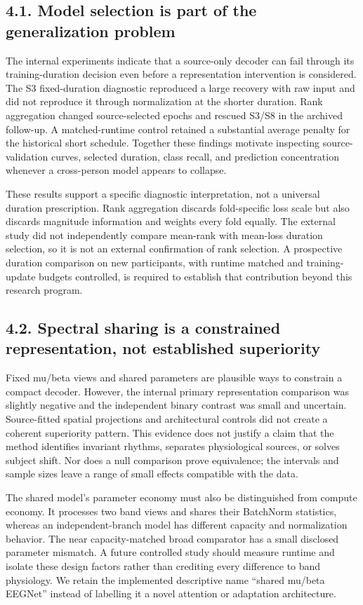 \documentclass[11pt]{article}
\begin{document}
\subsection*{4.1. Model selection is part of the generalization problem}
The internal experiments indicate that a source-only decoder can fail through its training-duration decision even before a representation intervention is considered. The S3 fixed-duration diagnostic reproduced a large recovery with raw input and did not reproduce it through normalization at the shorter duration. Rank aggregation changed source-selected epochs and rescued S3/S8 in the archived follow-up. A matched-runtime control retained a substantial average penalty for the historical short schedule. Together these findings motivate inspecting source-validation curves, selected duration, class recall, and prediction concentration whenever a cross-person model appears to collapse.

These results support a specific diagnostic interpretation, not a universal duration prescription. Rank aggregation discards fold-specific loss scale but also discards magnitude information and weights every fold equally. The external study did not independently compare mean-rank with mean-loss duration selection, so it is not an external confirmation of rank selection. A prospective duration comparison on new participants, with runtime matched and training-update budgets controlled, is required to establish that contribution beyond this research program.

\subsection*{4.2. Spectral sharing is a constrained representation, not established superiority}
Fixed mu/beta views and shared parameters are plausible ways to constrain a compact decoder. However, the internal primary representation comparison was slightly negative and the independent binary contrast was small and uncertain. Source-fitted spatial projections and architectural controls did not create a coherent superiority pattern. This evidence does not justify a claim that the method identifies invariant rhythms, separates physiological sources, or solves subject shift. Nor does a null comparison prove equivalence; the intervals and sample sizes leave a range of small effects compatible with the data.

The shared model's parameter economy must also be distinguished from compute economy. It processes two band views and shares their BatchNorm statistics, whereas an independent-branch model has different capacity and normalization behavior. The near capacity-matched broad comparator has a small disclosed parameter mismatch. A future controlled study should measure runtime and isolate these design factors rather than crediting every difference to band physiology. We retain the implemented descriptive name ``shared mu/beta EEGNet'' instead of labelling it a novel attention or adaptation architecture.
\end{document}
